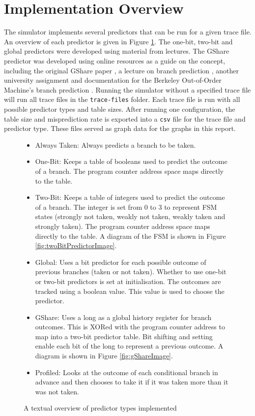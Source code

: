 \section{Implementation Overview}
The simulator implements several predictors that can be run for a given trace file. An overview of each predictor is given in Figure \ref{fig:predictors}. The one-bit, two-bit and global predictors were developed using material from lectures. The GShare predictor was developed using online resources as a guide on the concept, including the original GShare paper \cite{gshare_paper}, a lecture on branch prediction \cite{pittsburg_branch_prediction}, another university assignment \cite{gshare_assignment_edinburgh} and documentation for the Berkeley Out-of-Order Machine's branch prediction \cite{gshare_boom_core}. Running the simulator without a specified trace file will run all trace files in the \texttt{trace-files} folder. Each trace file is run with all possible predictor types and table sizes. After running one configuration, the table size and misprediction rate is exported into a \texttt{csv} file for the trace file and predictor type. These files served as graph data for the graphs in this report.

\begin{figure}[H]
    \begin{framed}
        \begin{itemize}
            \item Always Taken: Always predicts a branch to be taken.
            \item One-Bit: Keeps a table of booleans used to predict the outcome of a branch. The program counter address space maps directly to the table.
            \item Two-Bit: Keeps a table of integers used to predict the outcome of a branch. The integer is set from 0 to 3 to represent FSM states (strongly not taken, weakly not taken, weakly taken and strongly taken). The program counter address space maps directly to the table. A diagram of the FSM is shown in Figure \ref{fig:twoBitPredictorImage}.
            \item Global: Uses a bit predictor for each possible outcome of previous branches (taken or not taken). Whether to use one-bit or two-bit predictors is set at initialisation. The outcomes are tracked using a boolean value. This value is used to choose the predictor.
            \item GShare: Uses a long as a global history register for branch outcomes. This is XORed with the program counter address to map into a two-bit predictor table. Bit shifting and setting enable each bit of the long to represent a previous outcome. A diagram is shown in Figure \ref{fig:gShareImage}.
            \item Profiled: Looks at the outcome of each conditional branch in advance and then chooses to take it if it was taken more than it was not taken.
        \end{itemize}
    \end{framed}
    \caption{A textual overview of predictor types implemented}
    \label{fig:predictors}
\end{figure}

